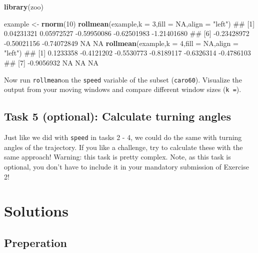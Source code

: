 \documentclass[]{book}
\newenvironment{Shaded}{\begin{snugshade}}{\end{snugshade}}
\newcommand{\KeywordTok}[1]{\textcolor[rgb]{0.13,0.29,0.53}{\textbf{#1}}}
\newcommand{\DataTypeTok}[1]{\textcolor[rgb]{0.13,0.29,0.53}{#1}}
\newcommand{\DecValTok}[1]{\textcolor[rgb]{0.00,0.00,0.81}{#1}}
\newcommand{\StringTok}[1]{\textcolor[rgb]{0.31,0.60,0.02}{#1}}
\newcommand{\OtherTok}[1]{\textcolor[rgb]{0.56,0.35,0.01}{#1}}
\newcommand{\NormalTok}[1]{#1}
\begin{document}
\begin{Shaded}
\begin{Highlighting}[]

\KeywordTok{library}\NormalTok{(zoo)}

\NormalTok{example <-}\StringTok{ }\KeywordTok{rnorm}\NormalTok{(}\DecValTok{10}\NormalTok{)}
\KeywordTok{rollmean}\NormalTok{(example,}\DataTypeTok{k =} \DecValTok{3}\NormalTok{,}\DataTypeTok{fill =} \OtherTok{NA}\NormalTok{,}\DataTypeTok{align =} \StringTok{"left"}\NormalTok{)}
\NormalTok{##  [1]  0.04231321  0.05972527 -0.59950086 -0.62501983 -1.21401680}
\NormalTok{##  [6] -0.23428972 -0.50021156 -0.74072849          NA          NA}
\KeywordTok{rollmean}\NormalTok{(example,}\DataTypeTok{k =} \DecValTok{4}\NormalTok{,}\DataTypeTok{fill =} \OtherTok{NA}\NormalTok{,}\DataTypeTok{align =} \StringTok{"left"}\NormalTok{)}
\NormalTok{##  [1]  0.1233358 -0.4121202 -0.5530773 -0.8189117 -0.6326314 -0.4786103}
\NormalTok{##  [7] -0.9056932         NA         NA         NA}
\end{Highlighting}
\end{Shaded}

Now run \texttt{rollmean}on the \texttt{speed} variable of the subset
(\texttt{caro60}). Visualize the output from your moving windows and
compare different window sizes (\texttt{k\ =}).

\subsection{Task 5 (optional): Calculate turning
angles}\label{task-5-optional-calculate-turning-angles}

Just like we did with \texttt{speed} in tasks 2 - 4, we could do the
same with turning angles of the trajectory. If you like a challenge, try
to calculate these with the same approach! Warning: this task is pretty
complex. Note, as this task is optional, you don't have to include it in
your mandatory submission of Exercise 2!

\section{Solutions}\label{solutions-1}

\subsection{Preperation}\label{preperation-2}
\end{document}
